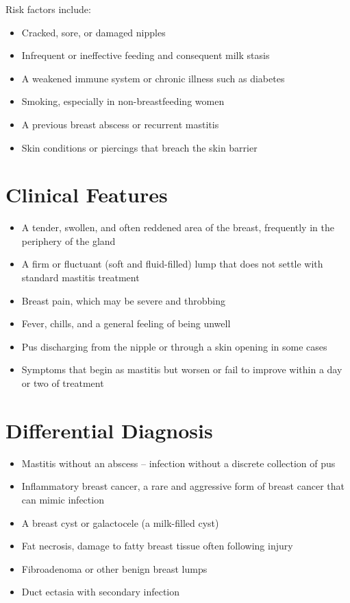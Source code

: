 Risk factors include:

\begin{itemize}
    \item Cracked, sore, or damaged nipples
    \item Infrequent or ineffective feeding and consequent milk stasis
    \item A weakened immune system or chronic illness such as diabetes
    \item Smoking, especially in non-breastfeeding women
    \item A previous breast abscess or recurrent mastitis
    \item Skin conditions or piercings that breach the skin barrier
\end{itemize}

\section*{Clinical Features}
\begin{itemize}
    \item A tender, swollen, and often reddened area of the breast, frequently in the periphery of the gland
    \item A firm or fluctuant (soft and fluid-filled) lump that does not settle with standard mastitis treatment
    \item Breast pain, which may be severe and throbbing
    \item Fever, chills, and a general feeling of being unwell
    \item Pus discharging from the nipple or through a skin opening in some cases
    \item Symptoms that begin as mastitis but worsen or fail to improve within a day or two of treatment
\end{itemize}

\section*{Differential Diagnosis}
\begin{itemize}
    \item Mastitis without an abscess -- infection without a discrete collection of pus
    \item Inflammatory breast cancer, a rare and aggressive form of breast cancer that can mimic infection
    \item A breast cyst or galactocele (a milk-filled cyst)
    \item Fat necrosis, damage to fatty breast tissue often following injury
    \item Fibroadenoma or other benign breast lumps
    \item Duct ectasia with secondary infection
\end{itemize}


